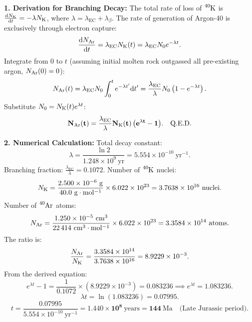\begin{solution}
\textbf{1. Derivation for Branching Decay:}
The total rate of loss of $\ce{^{40}K}$ is $\frac{\dd N_{\ce{K}}}{\dd t} = -\lambda N_{\ce{K}}$, where $\lambda = \lambda_{\text{EC}} + \lambda_\beta$.
The rate of generation of Argon-40 is exclusively through electron capture:
\[
\frac{\dd N_{\ce{Ar}}}{\dd t} = \lambda_{\text{EC}} N_{\ce{K}}(t) = \lambda_{\text{EC}} N_0 e^{-\lambda t}.
\]
Integrate from $0$ to $t$ (assuming initial molten rock outgassed all pre-existing argon, $N_{\ce{Ar}}(0) = 0$):
\[
N_{\ce{Ar}}(t) = \lambda_{\text{EC}} N_0 \int_0^t e^{-\lambda t'} \dd t' = \frac{\lambda_{\text{EC}}}{\lambda} N_0 \left( 1 - e^{-\lambda t} \right).
\]
Substitute $N_0 = N_{\ce{K}}(t) e^{\lambda t}$:
\[
\mathbf{N_{\ce{Ar}}(t) = \frac{\lambda_{\text{EC}}}{\lambda} N_{\ce{K}}(t) \left( e^{\lambda t} - 1 \right)}. \quad \text{Q.E.D.}
\]

\textbf{2. Numerical Calculation:}
Total decay constant:
\[
\lambda = \frac{\ln 2}{1.248 \times 10^9\ \mathrm{yr}} = 5.554 \times 10^{-10}\ \mathrm{yr^{-1}}.
\]
Branching fraction: $\frac{\lambda_{\text{EC}}}{\lambda} = 0.1072$.
Number of $\ce{^{40}K}$ nuclei:
\[
N_{\ce{K}} = \frac{2.500 \times 10^{-6}\ \mathrm{g}}{40.0\ \mathrm{g\cdot mol^{-1}}} \times 6.022 \times 10^{23} = 3.7638 \times 10^{16}\ \text{nuclei}.
\]
Number of $\ce{^{40}Ar}$ atoms:
\[
N_{\ce{Ar}} = \frac{1.250 \times 10^{-5}\ \mathrm{cm^3}}{22\,414\ \mathrm{cm^3\cdot mol^{-1}}} \times 6.022 \times 10^{23} = 3.3584 \times 10^{14}\ \text{atoms}.
\]
The ratio is:
\[
\frac{N_{\ce{Ar}}}{N_{\ce{K}}} = \frac{3.3584 \times 10^{14}}{3.7638 \times 10^{16}} = 8.9229 \times 10^{-3}.
\]
From the derived equation:
\[
e^{\lambda t} - 1 = \frac{1}{0.1072} \times \left( 8.9229 \times 10^{-3} \right) = 0.083236 \implies e^{\lambda t} = 1.083236.
\]
\[
\lambda t = \ln(1.083236) = 0.07995.
\]
\[
t = \frac{0.07995}{5.554 \times 10^{-10}\ \mathrm{yr^{-1}}} = \mathbf{1.440 \times 10^8\ \mathrm{years}} = \mathbf{144\ \mathrm{Ma}} \quad \text{(Late Jurassic period)}.
\]
\end{solution}

